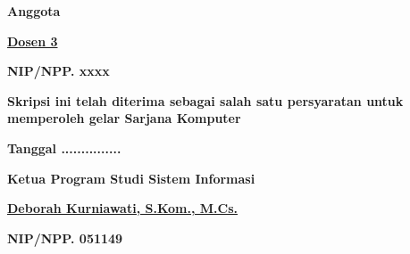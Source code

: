 \begin{center}
	\vspace{1\baselineskip}
	
	\begin{minipage}{\dimexpr0.6\textwidth}
		\hspace{\textwidth}
	\end{minipage}%
	\begin{minipage}{\dimexpr0.5\textwidth}
		\textbf{Anggota}
		
		\vspace{3\baselineskip}
		
		\textbf{\underline{Dosen 3}}
		
		\textbf{NIP/NPP. xxxx}
	\end{minipage}
	\vspace{\baselineskip}
	\textbf{Skripsi ini telah diterima sebagai salah satu persyaratan untuk
		memperoleh gelar Sarjana Komputer}
	
	\textbf{Tanggal ...............}
	
	\vspace{\baselineskip}
	
	\textbf{Ketua Program Studi Sistem Informasi}
	
	\vspace{3\baselineskip}
	
	\textbf{\underline{Deborah Kurniawati, S.Kom., M.Cs.}}
	
	\noindent\hspace*{-3.4cm}%
	\textbf{NIP/NPP. 051149}
	
\end{center}
